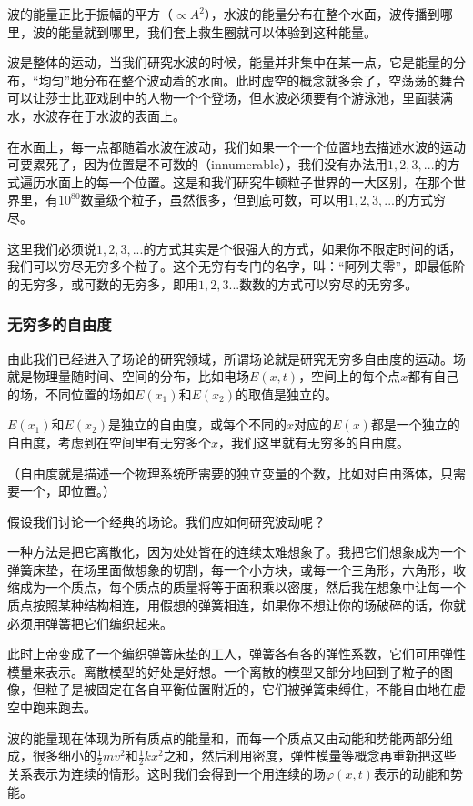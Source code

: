 波的能量正比于振幅的平方（$\propto A^2$），水波的能量分布在整个水面，波传播到哪里，波的能量就到哪里，我们套上救生圈就可以体验到这种能量。

波是整体的运动，当我们研究水波的时候，能量并非集中在某一点，它是能量的分布，“均匀”地分布在整个波动着的水面。此时虚空的概念就多余了，空荡荡的舞台可以让莎士比亚戏剧中的人物一个个登场，但水波必须要有个游泳池，里面装满水，水波存在于水波的表面上。

在水面上，每一点都随着水波在波动，我们如果一个一个位置地去描述水波的运动可要累死了，因为位置是不可数的（innumerable），我们没有办法用$1, 2, 3, ...$的方式遍历水面上的每一个位置。这是和我们研究牛顿粒子世界的一大区别，在那个世界里，有$10^{80}$数量级个粒子，虽然很多，但到底可数，可以用$1, 2, 3, ...$的方式穷尽。

这里我们必须说$1, 2, 3, ...$的方式其实是个很强大的方式，如果你不限定时间的话，我们可以穷尽无穷多个粒子。这个无穷有专门的名字，叫：“阿列夫零”，即最低阶的无穷多，或可数的无穷多，即用$1,2,3...$数数的方式可以穷尽的无穷多。

\subsubsection{无穷多的自由度}

由此我们已经进入了场论的研究领域，所谓场论就是研究无穷多自由度的运动。场就是物理量随时间、空间的分布，比如电场$E(x,t)$，空间上的每个点$x$都有自己的场，不同位置的场如$E(x_1)$和$E(x_2)$的取值是独立的。

$E(x_1)$和$E(x_2)$是独立的自由度，或每个不同的$x$对应的$E(x)$都是一个独立的自由度，考虑到在空间里有无穷多个$x$，我们这里就有无穷多的自由度。

（自由度就是描述一个物理系统所需要的独立变量的个数，比如对自由落体，只需要一个，即位置。）

假设我们讨论一个经典的场论。我们应如何研究波动呢？

一种方法是把它离散化，因为处处皆在的连续太难想象了。我把它们想象成为一个弹簧床垫，在场里面做想象的切割，每一个小方块，或每一个三角形，六角形，收缩成为一个质点，每个质点的质量将等于面积乘以密度，然后我在想象中让每一个质点按照某种结构相连，用假想的弹簧相连，如果你不想让你的场破碎的话，你就必须用弹簧把它们编织起来。

此时上帝变成了一个编织弹簧床垫的工人，弹簧各有各的弹性系数，它们可用弹性模量来表示。离散模型的好处是好想。一个离散的模型又部分地回到了粒子的图像，但粒子是被固定在各自平衡位置附近的，它们被弹簧束缚住，不能自由地在虚空中跑来跑去。

波的能量现在体现为所有质点的能量和，而每一个质点又由动能和势能两部分组成，很多细小的$\frac{1}{2} m v^2$和$\frac{1}{2}k x^2$之和，然后利用密度，弹性模量等概念再重新把这些关系表示为连续的情形。这时我们会得到一个用连续的场$\varphi(x,t)$表示的动能和势能。

